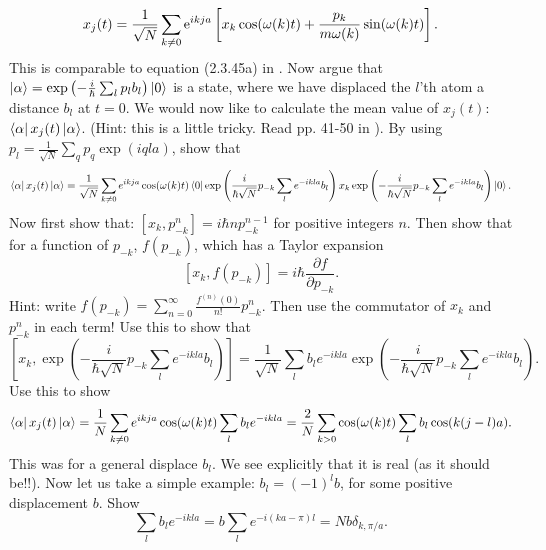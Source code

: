 \documentclass[10pt]{article}
\def\te{{\rm e}}
\begin{document}
\begin{equation}
x_j(t) = \frac{1}{\sqrt{N}}\sum_{k\neq 0} \te^{ikja}\left[x_k\cos(\omega(k)t)+\frac{p_k}{m\omega(k)}\sin(\omega(k)t) \right]. 
\label{eq.xj_xk_pk}
\end{equation}
This is comparable to equation (2.3.45a) in \cite{Sakurai}. 
Now argue that $\ket{\alpha}=\exp\left(-\frac{i}{\hbar}\sum_l p_l b_l\right)\ket{0}$ is a state, where we have displaced the $l$'th atom a distance $b_l$ at $t=0$. We would now like to calculate the mean value of $x_j(t)$: $\bra{\alpha}x_j(t)\ket{\alpha}$. (Hint: this is a little tricky. Read pp. 41-50 in \cite{Sakurai}). By using $p_l = \frac{1}{\sqrt{N}}\sum_q p_q\exp(iqla)$, show that
\begin{equation}
\bra{\alpha}x_j(t)\ket{\alpha} = \frac{1}{\sqrt{N}}\sum_{k\neq 0}e^{ikja}\cos(\omega(k)t)\bra{0}\exp\left(\frac{i}{\hbar \sqrt{N}}p_{-k}\sum_l e^{-ikla}b_l\right)x_k\exp\left(-\frac{i}{\hbar \sqrt{N}}p_{-k}\sum_l e^{-ikla}b_l\right)\ket{0}. \nonumber
\end{equation}
Now first show that: $\left[x_k, p_{-k}^n\right] = i\hbar np_{-k}^{n-1}$ for positive integers $n$. Then show that for a function of $p_{-k}$, $f(p_{-k})$, which has a Taylor expansion
\begin{equation}
\left[x_k, f(p_{-k})\right] = i\hbar \frac{\partial f}{\partial p_{-k}}.
\end{equation}
Hint: write $f(p_{-k}) = \sum_{n = 0}^{\infty} \frac{f^{(n)}(0)}{n!}p_{-k}^n$. Then use the commutator of $x_k$ and $p_{-k}^n$ in each term! Use this to show that
\begin{equation}
\left[x_k, \exp\left(-\frac{i}{\hbar \sqrt{N}}p_{-k}\sum_l e^{-ikla}b_l\right) \right] = \frac{1}{\sqrt{N}}\sum_l b_l e^{-ikla}\exp\left(-\frac{i}{\hbar \sqrt{N}}p_{-k}\sum_l e^{-ikla}b_l\right). \nonumber
\end{equation}
Use this to show
\begin{equation}
\bra{\alpha}x_j(t)\ket{\alpha} = \frac{1}{N}\sum_{k\neq 0} e^{ikja}\cos(\omega(k)t)\sum_l b_l e^{-ikla} = \frac{2}{N}\sum_{k>0} \cos(\omega(k)t)\sum_l b_l\cos(k(j-l)a).
\label{eq.mean_value_controlled_osc}
\end{equation}
This was for a general displace $b_l$. We see explicitly that it is real (as it should be!!). Now let us take a simple example: $b_l = (-1)^l b$, for some positive displacement $b$. Show
\begin{equation}
\sum_l b_l e^{-ikla} = b\sum_l e^{-i(ka-\pi)l} = Nb\delta_{k,\pi/a}.\nonumber
\end{equation}
\end{document}
